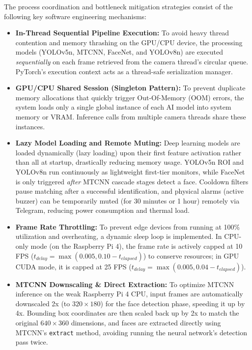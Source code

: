 \documentclass[12pt,a4paper]{article}
\begin{document}
The process coordination and bottleneck mitigation strategies consist of the following key software engineering mechanisms:
\begin{itemize}
    \item \textbf{In-Thread Sequential Pipeline Execution:} To avoid heavy thread contention and memory thrashing on the GPU/CPU device, the processing models (YOLOv5n, MTCNN, FaceNet, and YOLOv8n) are executed \textit{sequentially} on each frame retrieved from the camera thread's circular queue. PyTorch's execution context acts as a thread-safe serialization manager.
    \item \textbf{GPU/CPU Shared Session (Singleton Pattern):} To prevent duplicate memory allocations that quickly trigger Out-Of-Memory (OOM) errors, the system loads only a single global instance of each AI model into system memory or VRAM. Inference calls from multiple camera threads share these instances.
    \item \textbf{Lazy Model Loading and Remote Muting:} Deep learning models are loaded dynamically (lazy loading) upon their first feature activation rather than all at startup, drastically reducing memory usage. YOLOv5n ROI and YOLOv8n run continuously as lightweight first-tier monitors, while FaceNet is only triggered \textit{after} MTCNN cascade stages detect a face. Cooldown filters pause matching after a successful identification, and physical alarms (active buzzer) can be temporarily muted (for 30 minutes or 1 hour) remotely via Telegram, reducing power consumption and thermal load.
    \item \textbf{Frame Rate Throttling:} To prevent edge devices from running at 100\% utilization and overheating, a dynamic sleep loop is implemented. In CPU-only mode (on the Raspberry Pi 4), the frame rate is actively capped at 10 FPS ($t_{delay} = \max(0.005, 0.10 - t_{elapsed})$) to conserve resources; in GPU CUDA mode, it is capped at 25 FPS ($t_{delay} = \max(0.005, 0.04 - t_{elapsed})$).
    \item \textbf{MTCNN Downscaling \& Direct Extraction:} To optimize MTCNN inference on the weak Raspberry Pi 4 CPU, input frames are automatically downscaled 2x (to $320 \times 180$) for the face detection phase, speeding it up by 4x. Bounding box coordinates are then scaled back up by 2x to match the original $640 \times 360$ dimensions, and faces are extracted directly using MTCNN's \texttt{extract} method, avoiding running the neural network's detection pass twice.
\end{itemize}
\end{document}
